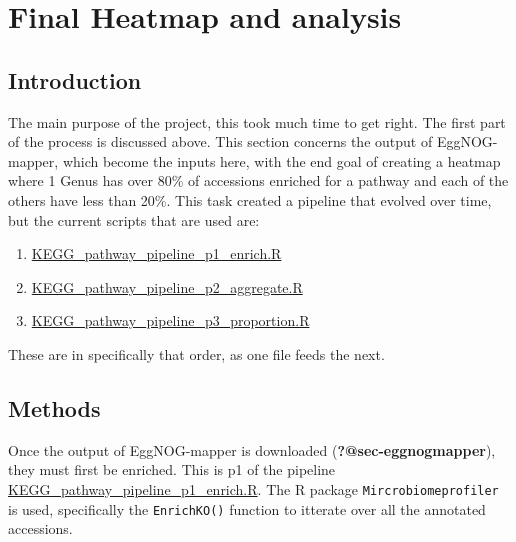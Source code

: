 \documentclass[
  letterpaper,
  DIV=11,
  numbers=noendperiod]{scrreprt}
\begin{document}

\chapter{Final Heatmap and analysis}\label{sec-heatmaps}

\section{Introduction}\label{introduction-13}

The main purpose of the project, this took much time to get right. The
first part of the process is discussed above. This section concerns the
output of EggNOG-mapper, which become the inputs here, with the end goal
of creating a heatmap where 1 Genus has over 80\% of accessions enriched
for a pathway and each of the others have less than 20\%. This task
created a pipeline that evolved over time, but the current scripts that
are used are:

\begin{enumerate}
\def\labelenumi{\arabic{enumi}.}
\item
  \href{https://github.com/tobiasnunn/tnunn_research/blob/09b6d09dd31e29cd56289794bffb23397e7baf15/Research_Experience_Module/00_scripts/Rscripts/KEGG_pathway_pipeline_p1_enrich.R}{KEGG\_pathway\_pipeline\_p1\_enrich.R}
\item
  \href{https://github.com/tobiasnunn/tnunn_research/blob/09b6d09dd31e29cd56289794bffb23397e7baf15/Research_Experience_Module/00_scripts/Rscripts/KEGG_pathway_pipeline_p2_aggregate.R}{KEGG\_pathway\_pipeline\_p2\_aggregate.R}
\item
  \href{https://github.com/tobiasnunn/tnunn_research/blob/09b6d09dd31e29cd56289794bffb23397e7baf15/Research_Experience_Module/00_scripts/Rscripts/KEGG_pathway_pipeline_p3_proportion.R}{KEGG\_pathway\_pipeline\_p3\_proportion.R}
\end{enumerate}

These are in specifically that order, as one file feeds the next.

\section{Methods}\label{methods-9}

Once the output of EggNOG-mapper is downloaded
(\textbf{?@sec-eggnogmapper}), they must first be enriched. This is p1
of the pipeline
\href{https://github.com/tobiasnunn/tnunn_research/blob/09b6d09dd31e29cd56289794bffb23397e7baf15/Research_Experience_Module/00_scripts/Rscripts/KEGG_pathway_pipeline_p1_enrich.R}{KEGG\_pathway\_pipeline\_p1\_enrich.R}.
The R package \texttt{Mircrobiomeprofiler} is used, specifically the
\texttt{EnrichKO()} function to itterate over all the annotated
accessions.
\end{document}
